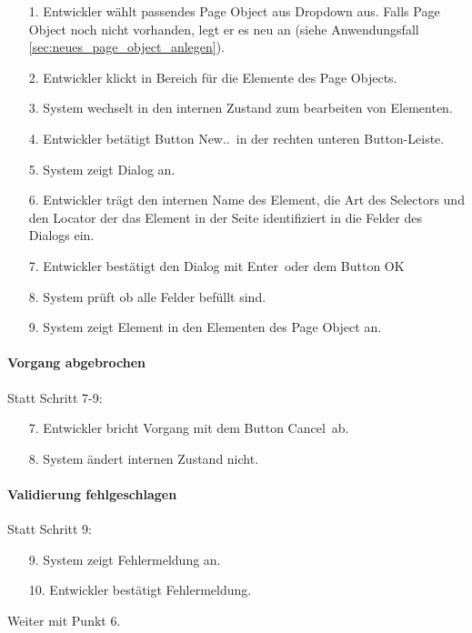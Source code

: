\begin{itemize}[itemsep=0pt]
\item[1.] Entwickler wählt passendes Page Object aus Dropdown aus. Falls Page Object noch nicht vorhanden, legt er es neu an (siehe Anwendungsfall \ref{sec:neues_page_object_anlegen}). 
\item[2.] Entwickler klickt in Bereich für die Elemente des Page Objects. 
\item[3.] System wechselt in den internen Zustand zum bearbeiten von Elementen.
\item[4.] Entwickler betätigt Button \grq New..\grq\ in der rechten unteren Button-Leiste.
\item[5.] System zeigt Dialog an. 
\item[6.] Entwickler trägt den internen Name des Element, die Art des Selectors und den Locator der das Element in der Seite identifiziert in die Felder des Dialogs ein.
\item[7.] Entwickler bestätigt den Dialog mit \grq Enter\grq\ oder dem Button \grq OK\grq\
\item[8.] System prüft ob alle Felder befüllt sind.
\item[9.] System zeigt Element in den Elementen des Page Object an.
\end{itemize}

\paragraph{Vorgang abgebrochen}
Statt Schritt 7-9:
\begin{itemize}[itemsep=0pt]
\item[7.] Entwickler bricht Vorgang mit dem Button \grq Cancel\grq\ ab. 
\item[8.] System ändert internen Zustand nicht. 
\end{itemize}

\paragraph{Validierung fehlgeschlagen}
Statt Schritt 9:
\begin{itemize}
\item[9.] System zeigt Fehlermeldung an. 
\item[10.] Entwickler bestätigt Fehlermeldung. 
\end{itemize}
Weiter mit Punkt 6. 











